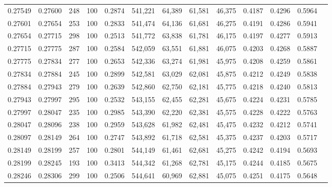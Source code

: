 \begin{tabular}{rrrrrrrrrrrrr}
0.27549 & 0.27600 &   248 & 100 &                                     0.2874 & 541,221 &  64,389 &  61,581 &  46,375 & 0.4187 & 0.4296 & 0.5964 \\
0.27601 & 0.27654 &   253 & 100 &                                     0.2833 & 541,474 &  64,136 &  61,681 &  46,275 & 0.4191 & 0.4286 & 0.5941 \\
0.27654 & 0.27715 &   298 & 100 &                                     0.2513 & 541,772 &  63,838 &  61,781 &  46,175 & 0.4197 & 0.4277 & 0.5913 \\
0.27715 & 0.27775 &   287 & 100 &                                     0.2584 & 542,059 &  63,551 &  61,881 &  46,075 & 0.4203 & 0.4268 & 0.5887 \\
0.27775 & 0.27834 &   277 & 100 &                                     0.2653 & 542,336 &  63,274 &  61,981 &  45,975 & 0.4208 & 0.4259 & 0.5861 \\
0.27834 & 0.27884 &   245 & 100 &                                     0.2899 & 542,581 &  63,029 &  62,081 &  45,875 & 0.4212 & 0.4249 & 0.5838 \\
0.27884 & 0.27943 &   279 & 100 &                                     0.2639 & 542,860 &  62,750 &  62,181 &  45,775 & 0.4218 & 0.4240 & 0.5813 \\
0.27943 & 0.27997 &   295 & 100 &                                     0.2532 & 543,155 &  62,455 &  62,281 &  45,675 & 0.4224 & 0.4231 & 0.5785 \\
0.27997 & 0.28047 &   235 & 100 &                                     0.2985 & 543,390 &  62,220 &  62,381 &  45,575 & 0.4228 & 0.4222 & 0.5763 \\
0.28047 & 0.28096 &   238 & 100 &                                     0.2959 & 543,628 &  61,982 &  62,481 &  45,475 & 0.4232 & 0.4212 & 0.5741 \\
0.28097 & 0.28149 &   264 & 100 &                                     0.2747 & 543,892 &  61,718 &  62,581 &  45,375 & 0.4237 & 0.4203 & 0.5717 \\
0.28149 & 0.28199 &   257 & 100 &                                     0.2801 & 544,149 &  61,461 &  62,681 &  45,275 & 0.4242 & 0.4194 & 0.5693 \\
0.28199 & 0.28245 &   193 & 100 &                                     0.3413 & 544,342 &  61,268 &  62,781 &  45,175 & 0.4244 & 0.4185 & 0.5675 \\
0.28246 & 0.28306 &   299 & 100 &                                     0.2506 & 544,641 &  60,969 &  62,881 &  45,075 & 0.4251 & 0.4175 & 0.5648 \\

\end{tabular}
